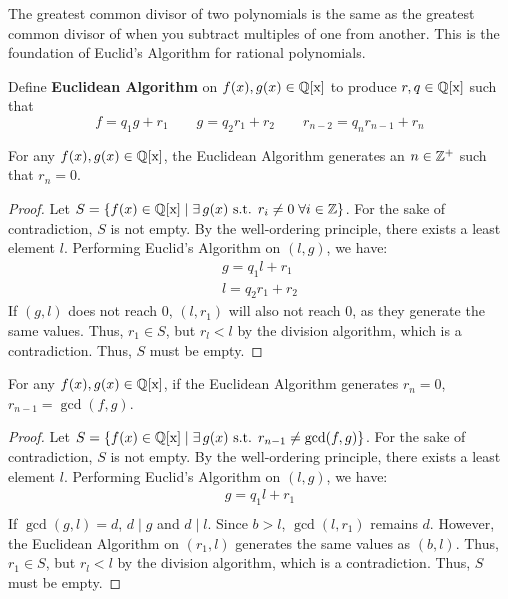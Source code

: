 The greatest common divisor of two polynomials is the same as the greatest common divisor of when you subtract multiples of one from another. This is the foundation of Euclid's Algorithm for rational polynomials.
\begin{definition}
    Define \textbf{Euclidean Algorithm} on $f(x), g(x) \in \operatorname{\mathbb{Q}[x]}$ to produce $r,q \in \operatorname{\mathbb{Q}[x]}$ such that 
    \[
        f = q_1g + r_1 \qquad 
        g = q_2r_1+r_2 \qquad
        r_{n-2} = q_n r_{n-1} + r_n
    \]
\end{definition}
\begin{lemma} For any $f(x), g(x) \in \operatorname{\mathbb{Q}[x]}$, the Euclidean Algorithm generates an $n \in \mathbb{Z}^+$ such that $r_n=0$.\end{lemma}
\begin{proof}
    Let $S=\left\{ f(x) \in \operatorname{\mathbb{Q}[x]} \;\middle | \;\exists \, g(x) \text{ s.t. } r_i \neq 0 \; \forall i \in \mathbb{Z} \right\}$. For the sake of contradiction, $S$ is not empty. By the well-ordering principle, there exists a least element $l$. Performing Euclid's Algorithm on $(l,g)$, we have:
    \begin{gather*}
        g = q_1l + r_1 \\
        l = q_2 r_1 + r_2
    \end{gather*}
If $(g,l)$ does not reach 0, $(l, r_1)$ will also not reach 0, as they generate the same values. Thus, $r_1\in S$, but $r_l<l$ by the division algorithm, which is a contradiction. Thus, $S$ must be empty.
\end{proof}

\begin{lemma} For any $f(x), g(x) \in \operatorname{\mathbb{Q}[x]}$, if the Euclidean Algorithm generates $r_n=0$, $r_{n-1} = \gcd(f, g)$.\end{lemma}
\begin{proof}
    Let $S=\left\{ f(x) \in \operatorname{\mathbb{Q}[x]} \;\middle | \;\exists \, g(x) \text{ s.t. } r_{n-1} \neq \operatorname{gcd}(f, g) \right\}$. For the sake of contradiction, $S$ is not empty. By the well-ordering principle, there exists a least element $l$. Performing Euclid's Algorithm on $(l,g)$, we have:
    \begin{gather*}
        g = q_1l + r_1 \\
    \end{gather*}
If $\gcd(g,l) = d$, $d \mid g$ and $d \mid l$. Since $b>l$, $\gcd(l, r_1)$ remains $d$. However, the Euclidean Algorithm on $(r_1, l)$ generates the same values as $(b, l)$. Thus, $r_1\in S$, but $r_l<l$ by the division algorithm, which is a contradiction. Thus, $S$ must be empty.
\end{proof}


